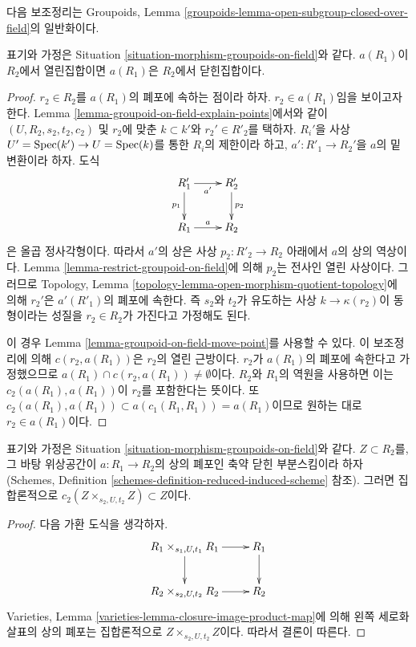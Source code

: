 \noindent
다음 보조정리는 Groupoids, Lemma
\ref{groupoids-lemma-open-subgroup-closed-over-field}의 일반화이다.

\begin{lemma}
\label{lemma-open-image-is-closed}
표기와 가정은 Situation \ref{situation-morphism-groupoids-on-field}와 같다.
$a(R_1)$이 $R_2$에서 열린집합이면 $a(R_1)$은 $R_2$에서 닫힌집합이다.
\end{lemma}

\begin{proof}
$r_2 \in R_2$를 $a(R_1)$의 폐포에 속하는 점이라 하자.
$r_2 \in a(R_1)$임을 보이고자 한다. Lemma
\ref{lemma-groupoid-on-field-explain-points}에서와 같이
$(U, R_2, s_2, t_2, c_2)$ 및 $r_2$에 맞춘 $k \subset k'$와
$r_2' \in R'_2$를 택하자. $R_i'$을 사상
$U' = \mathop{\mathrm{Spec}}(k') \to U = \mathop{\mathrm{Spec}}(k)$를 통한 $R_i$의 제한이라 하고,
$a' : R'_1 \to R_2'$을 $a$의 밑변환이라 하자. 도식
$$
\xymatrix{
R'_1 \ar[r]_{a'} \ar[d]_{p_1} & R'_2 \ar[d]^{p_2} \\
R_1 \ar[r]^a & R_2
}
$$
은 올곱 정사각형이다. 따라서 $a'$의 상은 사상
$p_2 : R'_2 \to R_2$ 아래에서 $a$의 상의 역상이다. Lemma
\ref{lemma-restrict-groupoid-on-field}에 의해 $p_2$는 전사인 열린 사상이다.
그러므로 Topology, Lemma
\ref{topology-lemma-open-morphism-quotient-topology}에 의해
$r_2'$은 $a'(R'_1)$의 폐포에 속한다. 즉 $s_2$와 $t_2$가 유도하는 사상
$k \to \kappa(r_2)$이 동형이라는 성질을 $r_2 \in R_2$가 가진다고
가정해도 된다.

\medskip\noindent
이 경우 Lemma \ref{lemma-groupoid-on-field-move-point}를 사용할 수 있다.
이 보조정리에 의해 $c(r_2, a(R_1))$은 $r_2$의 열린 근방이다.
$r_2$가 $a(R_1)$의 폐포에 속한다고 가정했으므로
$a(R_1) \cap c(r_2, a(R_1)) \not = \emptyset$이다. $R_2$와 $R_1$의
역원을 사용하면 이는 $c_2(a(R_1), a(R_1))$이 $r_2$를 포함한다는 뜻이다.
또 $c_2(a(R_1), a(R_1)) \subset a(c_1(R_1, R_1)) = a(R_1)$이므로
원하는 대로 $r_2 \in a(R_1)$이다.
\end{proof}

\begin{lemma}
\label{lemma-map-groupoids-on-field-image}
표기와 가정은 Situation \ref{situation-morphism-groupoids-on-field}와 같다.
$Z \subset R_2$를, 그 바탕 위상공간이 $a : R_1 \to R_2$의 상의 폐포인
축약 닫힌 부분스킴이라 하자(Schemes, Definition
\ref{schemes-definition-reduced-induced-scheme} 참조). 그러면 집합론적으로
$c_2(Z \times_{s_2, U, t_2} Z) \subset Z$이다.
\end{lemma}

\begin{proof}
다음 가환 도식을 생각하자.
$$
\xymatrix{
R_1 \times_{s_1, U, t_1} R_1 \ar[r] \ar[d] & R_1 \ar[d] \\
R_2 \times_{s_2, U, t_2} R_2 \ar[r] & R_2
}
$$
Varieties, Lemma \ref{varieties-lemma-closure-image-product-map}에 의해 왼쪽
세로화살표의 상의 폐포는 집합론적으로 $Z \times_{s_2, U, t_2} Z$이다.
따라서 결론이 따른다.
\end{proof}


